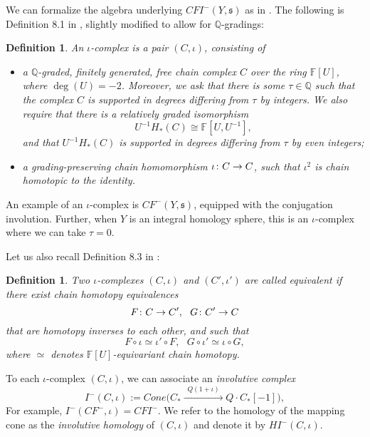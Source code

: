 \documentclass[11 pt]{amsart}
\newtheorem {definition}[theorem]{Definition}
\theoremstyle{remark}
\newcommand\Q{\mathbb{Q}}
\def\s{\mathfrak s}
\def\ff {{\mathbb{F}}}
\def\ccdot {\! \cdot \!}
\def\Cone{\mathit{Cone}}
\def\CF {\mathit{CF}}
\newcommand \CFm {\CF^-}
\def\HIm{\mathit{HI}^-}
\def\CFI {\mathit{CFI}}
\newcommand \CFIm {\CFI^-}
\def\inv{\iota}
\newcommand{\co}{\nobreak\mskip2mu\mathpunct{}\nonscript
  \mkern-\thinmuskip{:}\penalty300\mskip6muplus1mu\relax}
\begin{document}
We can formalize the algebra underlying $\CFIm(Y, \s)$ as in \cite[Section 8]{HMZ}. The following is Definition 8.1 in \cite{HMZ}, slightly modified to allow for $\Q$-gradings:
\begin{definition}
\label{def:icx}
An {\em $\inv$-complex} is a pair $(C, \inv)$, consisting of
\begin{itemize}
\item a $\Q$-graded, finitely generated, free chain complex $C$ over the ring $\ff[U]$, where $\operatorname{deg}(U)=-2$. Moreover, we ask that there is some $\tau \in \Q$ such that the complex $C$ is supported in degrees differing from $\tau$ by integers. We also require that there is a relatively graded isomorphism
\begin{equation}
\label{eq:Utail}
U^{-1}H_*(C) \cong \ff[U, U^{-1}],
\end{equation}
and that $U^{-1}H_*(C)$ is supported in degrees differing from $\tau$ by even integers;
\item a grading-preserving chain homomorphism $\inv \co C \to C$, such that $\inv^2$ is chain homotopic to the identity.
\end{itemize}
\end{definition}

An example of an $\inv$-complex is $\CFm(Y, \s)$, equipped with the conjugation involution. Further, when $Y$ is an integral homology sphere, this is an $\inv$-complex where we can take $\tau=0$.

Let us also recall Definition 8.3 in \cite{HMZ}:
\begin{definition}
\label{def:E}
Two $\inv$-complexes $(C, \inv)$ and $(C', \inv')$ are called {\em equivalent} if there exist chain homotopy equivalences
$$ F \co C \to C', \ \ G \co C' \to C$$
that are homotopy inverses to each other, and such that 
$$F \circ \inv \simeq \inv' \circ F,  \ \ \ G \circ \inv' \simeq \inv \circ G,$$
where $\simeq$ denotes $\ff[U]$-equivariant chain homotopy.
\end{definition}

To each $\inv$-complex $(C, \inv)$, we can associate an {\em involutive complex}
\begin{equation}
\label{eq:invcx}
I^-(C, \inv) := \Cone\bigl(C_* \xrightarrow{\phantom{o} Q (1+\inv) \phantom{o}} Q \ccdot C_* [-1]\bigr),
 \end{equation}
For example, $I^-(\CFm, \inv) = \CFIm$. We refer to the homology of the mapping cone as the \textit{involutive homology} of $(C, \inv)$ and denote it by $\HIm(C, \inv)$.
\end{document}
